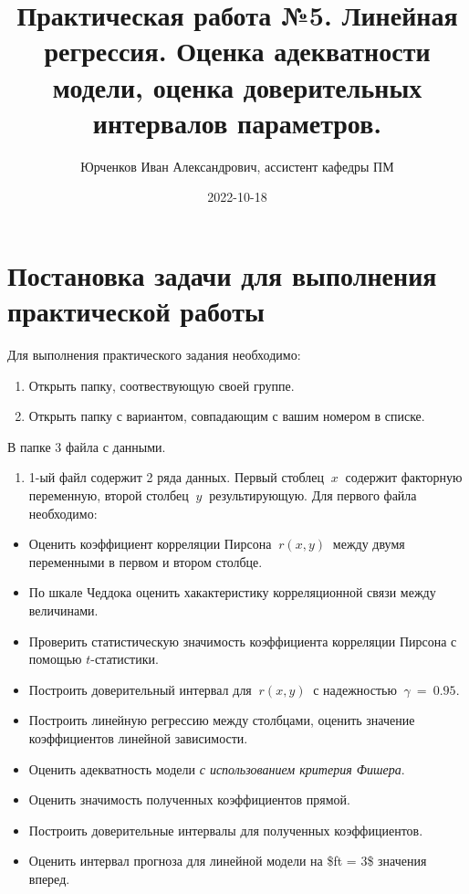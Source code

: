 \documentclass[
]{article}
\title{Практическая работа №5. Линейная регрессия. Оценка адекватности
модели, оценка доверительных интервалов параметров.}
\author{Юрченков Иван Александрович, ассистент кафедры ПМ}
\date{2022-10-18}
\providecommand{\tightlist}{%
  \setlength{\itemsep}{0pt}\setlength{\parskip}{0pt}}
\begin{document}
\maketitle

\hypertarget{ux43fux43eux441ux442ux430ux43dux43eux432ux43aux430-ux437ux430ux434ux430ux447ux438-ux434ux43bux44f-ux432ux44bux43fux43eux43bux43dux435ux43dux438ux44f-ux43fux440ux430ux43aux442ux438ux447ux435ux441ux43aux43eux439-ux440ux430ux431ux43eux442ux44b}{%
\section{\texorpdfstring{\textbf{Постановка задачи для выполнения
практической
работы}}{Постановка задачи для выполнения практической работы}}\label{ux43fux43eux441ux442ux430ux43dux43eux432ux43aux430-ux437ux430ux434ux430ux447ux438-ux434ux43bux44f-ux432ux44bux43fux43eux43bux43dux435ux43dux438ux44f-ux43fux440ux430ux43aux442ux438ux447ux435ux441ux43aux43eux439-ux440ux430ux431ux43eux442ux44b}}

Для выполнения практического задания необходимо:

\begin{enumerate}
\def\labelenumi{\arabic{enumi}.}
\item
  Открыть папку, соотвествующую своей группе.
\item
  Открыть папку с вариантом, совпадающим с вашим номером в списке.
\end{enumerate}

В папке 3 файла с данными.

\begin{enumerate}
\def\labelenumi{\arabic{enumi}.}
\tightlist
\item
  1-ый файл содержит 2 ряда данных. Первый стоблец \(\ x\ \) содержит
  факторную переменную, второй столбец \(\ y\ \) результирующую. Для
  первого файла необходимо:
\end{enumerate}

\begin{itemize}
\item
  Оценить коэффициент корреляции Пирсона \(\ r(x, y)\ \) между двумя
  переменными в первом и втором столбце.
\item
  По шкале Чеддока оценить хакактеристику корреляционной связи между
  величинами.
\item
  Проверить статистическую значимость коэффициента корреляции Пирсона с
  помощью \(t\)-статистики.
\item
  Построить доверительный интервал для \(\ r(x, y)\ \) с надежностью
  \(\ \gamma\ = \ 0.95\).
\item
  Построить линейную регрессию между столбцами, оценить значение
  коэффициентов линейной зависимости.
\item
  Оценить адекватность модели \emph{с использованием критерия Фишера}.
\item
  Оценить значимость полученных коэффициентов прямой.
\item
  Построить доверительные интервалы для полученных коэффициентов.
\item
  Оценить интервал прогноза для линейной модели на \$ft = 3\$ значения
  вперед.
\end{itemize}
\end{document}
